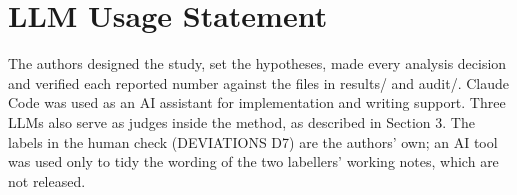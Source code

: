 \documentclass[10.5pt]{article}
\begin{document}
\section*{LLM Usage Statement}
The authors designed the study, set the hypotheses, made every analysis decision and verified each reported number against the files in results/ and audit/. Claude Code was used as an AI assistant for implementation and writing support. Three LLMs also serve as judges inside the method, as described in Section 3. The labels in the human check (DEVIATIONS D7) are the authors' own; an AI tool was used only to tidy the wording of the two labellers' working notes, which are not released.
\end{document}
